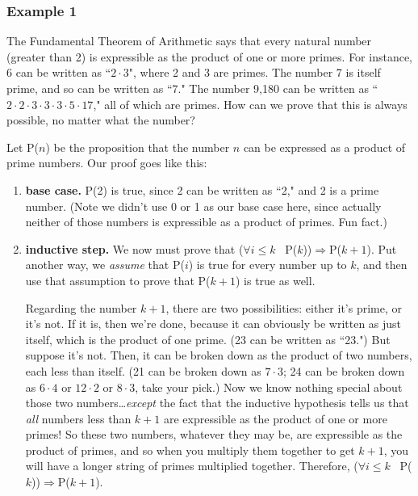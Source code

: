 \subsubsection{Example 1}

The Fundamental Theorem of Arithmetic says that every natural number
(greater than 2) is expressible as the product of one or more primes.  For
instance, 6 can be written as ``$2 \cdot 3$", where 2 and 3 are primes. The
number 7 is itself prime, and so can be written as ``$7$." The number 9,180
can be written as ``$2 \cdot 2 \cdot 3 \cdot 3 \cdot 3 \cdot 5 \cdot 17$," all of
which are primes. How can we prove that this is always possible, no matter
what the number?

Let P($n$) be the proposition that the number $n$ can be expressed as a
product of prime numbers. Our proof goes like this:

\begin{enumerate} 

\item \textbf{base case.} P(2) is true, since 2 can be written as ``2," and
2 is a prime number. (Note we didn't use 0 or 1 as our base case here,
since actually neither of those numbers is expressible as a product of
primes. Fun fact.)

\item \textbf{inductive step.}
We now must prove that ($\forall i \leq k$ \ P($k$))$\Rightarrow$P($k+1$).
Put another way, we \textit{assume} that P($i$) is true for every number up
to $k$, and then use that assumption to prove that P($k+1$) is true as
well.

Regarding the number $k+1$, there are two possibilities: either it's prime,
or it's not. If it is, then we're done, because it can obviously be written
as just itself, which is the product of one prime. (23 can be written as
``23.") But suppose it's not.
Then, it can be broken down as the product of two numbers, each less than
itself. (21 can be broken down as $7 \cdot 3$; 24 can be broken down as $6
\cdot 4$ or $12 \cdot 2$ or $8 \cdot 3$, take your pick.) Now we know nothing
special about those two numbers\dots \textit{except} the fact that the
inductive hypothesis tells us that \textit{all} numbers less than $k+1$ are
expressible as the product of one or more primes! So these two numbers,
whatever they may be, are expressible as the product of primes, and so when
you multiply them together to get $k+1$, you will have a longer string of
primes multiplied together. Therefore, ($\forall i \leq k$ \
P($k$))$\Rightarrow$P($k+1$).

\end{enumerate}

